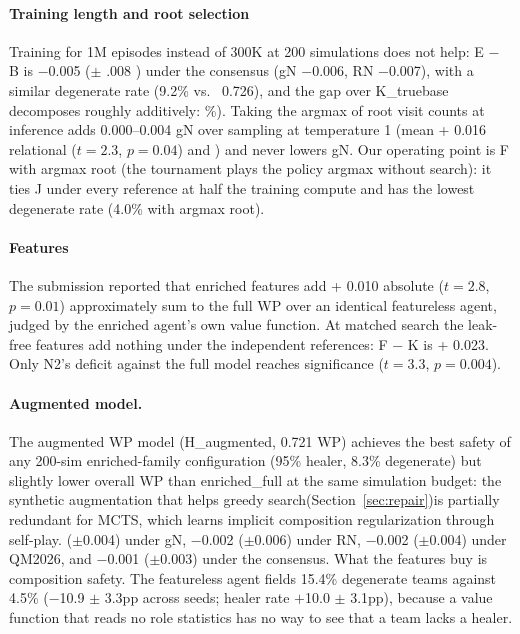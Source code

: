 \documentclass[journal]{IEEEtran}
\providecommand{\DIFaddtex}[1]{{\protect\color{blue} \sf #1}} %
\providecommand{\DIFdeltex}[1]{{\protect\color{red} \scriptsize #1}} %
\providecommand{\DIFaddbegin}{} %
\providecommand{\DIFaddend}{} %
\providecommand{\DIFdelbegin}{} %
\providecommand{\DIFdelend}{} %
\providecommand{\DIFadd}[1]{\texorpdfstring{\DIFaddtex{#1}}{#1}} %
\providecommand{\DIFdel}[1]{\texorpdfstring{\DIFdeltex{#1}}{}} %
\begin{document}
\paragraph{\DIFadd{Training length and root selection}} \DIFadd{Training for 1M episodes instead of 300K at 200 simulations does not help: E $-$ B is $-$0.005 (}\DIFaddend $\pm$\DIFdelbegin \DIFdel{.008 }\DIFdelend \DIFaddbegin \DIFadd{0.003) under the consensus (gN $-$0.006, RN $-$0.007), with a similar degenerate rate (9.2\% }\DIFaddend vs.\ \DIFdelbegin \DIFdel{0.726), and the gap over K\_truebase decomposes roughly additively: }\DIFdelend \DIFaddbegin \DIFadd{10.5\%). Taking the argmax of root visit counts at inference adds 0.000--0.004 gN over sampling at temperature 1 (mean }\DIFaddend +\DIFdelbegin \DIFdel{0.016 relational ($t = 2.3$, $p = 0.04$) and }\DIFdelend \DIFaddbegin \DIFadd{0.002) and never lowers gN. Our operating point is F with argmax root (the tournament plays the policy argmax without search): it ties J under every reference at half the training compute and has the lowest degenerate rate (4.0\% with argmax root).
}

\paragraph{\DIFadd{Features}} \DIFadd{The submission reported that enriched features add }\DIFaddend +\DIFdelbegin \DIFdel{0.010 absolute ($t = 2.8$, $p = 0.01$) approximately sum to the full }\DIFdelend \DIFaddbegin \DIFadd{0.023 WP over an identical featureless agent, judged by the enriched agent's own value function. At matched search the leak-free features add nothing under the independent references: F $-$ K is }\DIFaddend +\DIFdelbegin \DIFdel{0.023. Only N2's deficit against the full model reaches significance ($t = 3.3$, $p = 0.004$).
}\paragraph{\DIFdel{Augmented model.}} %
\addtocounter{paragraph}{-1}%
\DIFdel{The augmented WP model (H\_augmented, 0.721 WP) achieves the best safety of any 200-sim enriched-family configuration (95\% healer, 8.3\% degenerate) but slightly lower overall WP than enriched\_full at the same simulation budget: the synthetic augmentation that helps greedy search(Section~\ref{sec:repair})is partially redundant for MCTS, which learns implicit composition regularization through self-play.
}\DIFdelend \DIFaddbegin \DIFadd{0.002 ($\pm$0.004) under gN, $-$0.002 ($\pm$0.006) under RN, $-$0.002 ($\pm$0.004) under QM2026, and $-$0.001 ($\pm$0.003) under the consensus. What the features buy is composition safety. The featureless agent fields 15.4\% degenerate teams against 4.5\% ($-$10.9 $\pm$ 3.3pp across seeds; healer rate $+$10.0 $\pm$ 3.1pp), because a value function that reads no role statistics has no way to see that a team lacks a healer.
}\DIFaddend 
\end{document}
